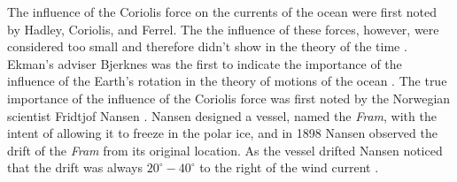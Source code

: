 The influence of the Coriolis force on the currents of the ocean were first
noted by Hadley, Coriolis, and Ferrel. The the influence of these forces,
however, were considered too small and therefore didn't show in the theory of
the time \cite{Ekman1905}. Ekman's adviser Bjerknes was the first to indicate
the importance of the influence of the Earth's rotation in the theory of motions
of the ocean \cite{Ekman1905}. The true importance of the influence of the
Coriolis force was first noted by the Norwegian scientist Fridtjof Nansen
\cite{Beesley2008, Ekman1905}. Nansen designed a vessel, named the \emph{Fram},
with the intent of allowing it to freeze in the polar ice, and in 1898 Nansen
observed the drift of the \emph{Fram} from its original location. As the vessel
drifted Nansen noticed that the drift was always $20^\circ - 40^\circ$ to the
right of the wind current \cite{Beesley2008}.

